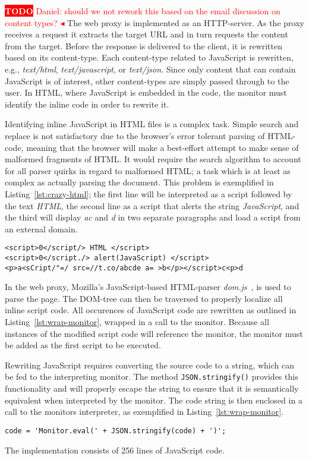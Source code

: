 \documentclass{llncs}
\newcommand{\todo}[1]{\colorbox{red}{\textcolor{white}{\sffamily\bfseries\scriptsize TODO}} \textcolor{red}{#1} \textcolor{red}{$\blacktriangleleft$}}
\begin{document}
\todo{Daniel: should we not rework this based on the email discussion on content types?}
The web proxy is implemented as an HTTP-server. As the 
proxy receives a request it extracts the target URL and in turn requests the 
content from the target. Before the response is delivered to the client, it is 
rewritten based on its content-type. Each content-type related to JavaScript is 
rewritten, e.g., \emph{text/html}, \emph{text/javascript}, or \emph{text/json}. 
Since only content that can contain JavaScript is of interest, other 
content-types are simply passed through to the user. In HTML, where 
JavaScript is embedded in the code, the monitor must identify 
the inline code in order to rewrite it.

Identifying inline JavaScript in HTML files is a complex task. 
Simple search and replace is not satisfactory due to the browser's error tolerant parsing of HTML-code, meaning that the 
browser will make a best-effort attempt to make sense of malformed fragments of 
HTML. It would require the search 
algorithm to account for all parser quirks in regard to malformed HTML;
a task which is at least as complex as actually parsing the document.
This problem is exemplified in Listing~\ref{lst:crazy-html}; the first line
will be interpreted as a script followed by the text \emph{HTML}, the second
line as a script that alerts the string \emph{JavaScript}, and the third will 
display \emph{ac} and \emph{d} in two separate paragraphs and load a script
from an external domain.

\begin{lstlisting}[language=langsmall,label=lst:crazy-html, caption=Example of complicated HTML]
<script>0</script/> HTML </script>
<script>0</script./> alert(JavaScript) </script>
<p>a<sCript/"=/ src=//t.co/abcde a= >b</p></script>c<p>d
\end{lstlisting}


In the web proxy, Mozilla's JavaScript-based HTML-parser \emph{dom.js}~\cite{Mozilla:dom.js}, is used 
to parse the page. The DOM-tree can then be traversed to properly localize 
all inline script code. All occurences of JavaScript code are rewritten as 
outlined in Listing~\ref{lst:wrap-monitor}, wrapped in a call to the monitor.
Because all instances of the modified script code will reference the monitor, 
the monitor must be added as the first script to be executed.


Rewriting JavaScript requires converting the source code to a string, which can 
be fed to the interpreting monitor. The method \lstinline{JSON.stringify()} 
provides this functionality and will properly escape the string to ensure that 
it is semantically equivalent when interpreted by the monitor. The code string is then enclosed in a call to the monitors 
interpreter, as exemplified in Listing~\ref{lst:wrap-monitor}.
\begin{lstlisting}[language=langsmall,label=lst:wrap-monitor, caption=Example of monitor wrapping]
code = 'Monitor.eval(' + JSON.stringify(code) + ')';
\end{lstlisting}
The implementation consists of 256 lines of JavaScript code.
\end{document}
